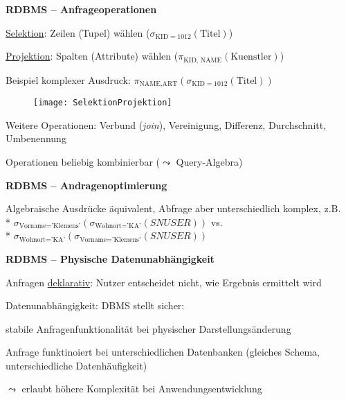 \textbf{RDBMS -- Anfrageoperationen}
\begin{items}
  \item \underline{Selektion}: Zeilen (Tupel) wählen (\( \sigma_{\text{KID}=1012}(\text{Titel}) \))
  \item \underline{Projektion}: Spalten (Attribute) wählen (\( \pi_{\text{KID, NAME}}(\text{Kuenstler}) \))
  \item Beispiel komplexer Ausdruck: \( \pi_{\text{NAME}, \text{ART}}(\sigma_{\text{KID}=1012}(\text{Titel})) \)
  \begin{figure}[H]\centering\label{SelektionProjektion}\texttt{[image: SelektionProjektion]}\end{figure}
  \item Weitere Operationen: Verbund (\emph{join}), Vereinigung, Differenz, Durchschnitt, Umbenennung
  \item Operationen beliebig kombinierbar (\( \leadsto \) Query-Algebra)
\end{items}

\textbf{RDBMS -- Andragenoptimierung}
\begin{items}
  \item Algebraische Ausdrücke äquivalent, Abfrage aber unterschiedlich komplex, z.B. \\* \( \sigma_{\text{Vorname} = \text{'Klemens'}}(\sigma_{\text{Wohnort} = \text{'KA'}}(SNUSER)) \) vs. \\* \( \sigma_{\text{Wohnort} = \text{'KA'}}(\sigma_{\text{Vorname} = \text{'Klemens'}}(SNUSER)) \)
\end{items}

\textbf{RDBMS -- Physische Datenunabhängigkeit}
\begin{items}
  \item Anfragen \underline{deklarativ}: Nutzer entscheidet nicht, wie Ergebnis ermittelt wird
  \item Datenunabhängigkeit: DBMS stellt sicher:
  \begin{enumeration}
    \item stabile Anfragenfunktionalität bei physischer Darstellungsänderung
    \item Anfrage funktinoiert bei unterschiedlichen Datenbanken (gleiches Schema, unterschiedliche Datenhäufigkeit)
  \end{enumeration}
  \item \( \leadsto \) erlaubt höhere Komplexität bei Anwendungsentwicklung
\end{items}

